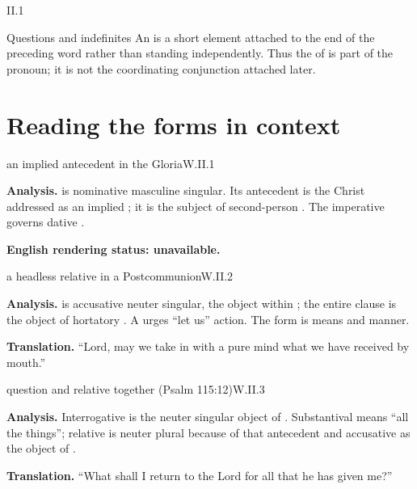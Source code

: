 \begin{courseunit}{II.1}
\begin{grammarbox}{Questions and indefinites}
An  is a short element attached to the end of the preceding
word rather than standing independently. Thus the  of  is part of the
pronoun; it is not the coordinating conjunction  attached later.
\end{grammarbox}

\section{Reading the forms in context}

\begin{workedexample}{an implied antecedent in the Gloria}{W.II.1}

\textbf{Analysis.}   is nominative masculine singular.  Its antecedent is the
Christ addressed as an implied ; it is the subject of second-person
.  The imperative  governs dative .

\textbf{English rendering status: unavailable.}
\end{workedexample}

\begin{workedexample}{a headless relative in a Postcommunion}{W.II.2}

\textbf{Analysis.}   is accusative neuter singular, the object within
; the entire clause  is the object of hortatory
. A  urges ``let us'' action.
The form  is means and  manner.

\textbf{Translation.}  ``Lord, may we take in with a pure mind what we have received by
mouth.''
\end{workedexample}

\begin{workedexample}{question and relative together (Psalm 115:12)}{W.II.3}

\textbf{Analysis.}  Interrogative  is the neuter singular object of
.  Substantival  means ``all the things''; relative
 is neuter plural because of that antecedent and accusative as the object of
.

\textbf{Translation.}  ``What shall I return to the Lord for all that he has given me?''
\end{workedexample}


\end{courseunit}
